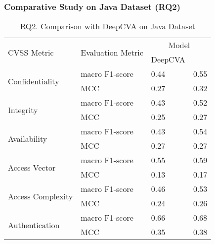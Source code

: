 \subsubsection{\bf Comparative Study on Java Dataset (RQ2)}

\begin{table}[t]
	\caption{RQ2. Comparison with DeepCVA on Java Dataset}
        \vspace{-9pt}
	\begin{center}
\small
		\renewcommand{\arraystretch}{1}
		\begin{tabular}{l|p{1.9cm}<{\centering}|p{1.5cm}<{\centering}|p{1.5cm}<{\centering}}
			\hline
			\multirow{2}{*}{CVSS Metric}     & \multirow{2}{*}{Evaluation Metric}  & \multicolumn{2}{c}{Model}\\
			\cline{3-4}
			&                                     & DeepCVA    & \tool       \\
			\hline
			\multirow{2}{*}{Confidentiality} & macro F1-score                             &     0.44       & 0.55\\
			\cline{2-4}
			& MCC                                 &      0.27      & 0.32\\
			\hline
			\multirow{2}{*}{Integrity}       & macro F1-score                             &    0.43        & 0.52\\
			\cline{2-4}
			& MCC                                 &    0.25        & 0.27\\
			\hline
			\multirow{2}{*}{Availability}    & macro F1-score                             &   0.43         & 0.54\\
			\cline{2-4}
			& MCC                                 &    0.27        & 0.27\\
			\hline
			\multirow{2}{*}{Access Vector}   & macro F1-score                             &   0.55         & 0.59\\
			\cline{2-4}
			& MCC                                 &    0.13        & 0.17\\
			\hline
			\multirow{2}{*}{Access Complexity} & macro F1-score                           &   0.46         & 0.53\\
			\cline{2-4}
			& MCC                                 &    0.24        & 0.26\\
			\hline
			\multirow{2}{*}{Authentication}  & macro F1-score                             &   0.66         & 0.68\\
			\cline{2-4}
			& MCC                                 &   0.35         & 0.38\\

\end{tabular}
\end{center}
\end{table}
